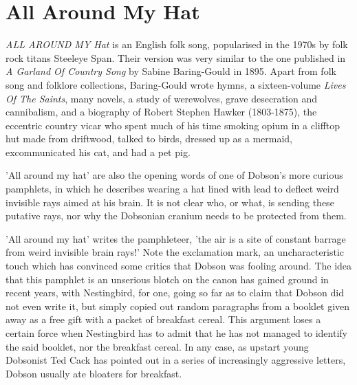 \chapter{All Around My Hat}

\emph{ALL AROUND MY Hat} is an English folk song, popularised in the 1970s by folk rock titans Steeleye Span. Their version was very similar to the one published in \emph{A Garland Of Country Song} by Sabine Baring-Gould in 1895. Apart from folk song and folklore collections, Baring-Gould wrote hymns, a sixteen-volume \emph{Lives Of The Saints}, many novels, a study of werewolves, grave desecration and cannibalism, and a biography of Robert Stephen Hawker (1803-1875), the eccentric country vicar who spent much of his time smoking opium in a clifftop hut made from driftwood, talked to birds, dressed up as a mermaid, excommunicated his cat, and had a pet pig.

'All around my hat' are also the opening words of one of Dobson's more curious pamphlets, in which he describes wearing a hat lined with lead to deflect weird invisible rays aimed at his brain. It is not clear who, or what, is sending these putative rays, nor why the Dobsonian cranium needs to be protected from them.

'All around my hat' writes the pamphleteer, 'the air is a site of constant barrage from weird invisible brain rays!' Note the exclamation mark, an uncharacteristic touch which has convinced some critics that Dobson was fooling around. The idea that this pamphlet is an unserious blotch on the canon has gained ground in recent years, with Nestingbird, for one, going so far as to claim that Dobson did not even write it, but simply copied out random paragraphs from a booklet given away as a free gift with a packet of breakfast cereal. This argument loses a certain force when Nestingbird has to admit that he has not managed to identify the said booklet, nor the breakfast cereal. In any case, as upstart young Dobsonist Ted Cack has pointed out in a series of increasingly aggressive letters, Dobson usually ate bloaters for breakfast.

